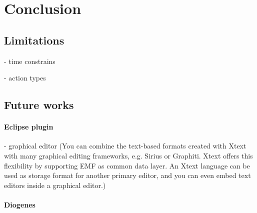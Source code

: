 \section{Conclusion}

\subsection{Limitations}
- time constrains

- action types

\subsection{Future works}

\paragraph{Eclipse plugin}
- graphical editor (You can combine the text-based formats created with Xtext with many graphical editing frameworks, e.g. Sirius or Graphiti. Xtext offers this flexibility by supporting EMF as common data layer. An Xtext language can be used as storage format for another primary editor, and you can even embed text editors inside a graphical editor.)

\paragraph{Diogenes}
